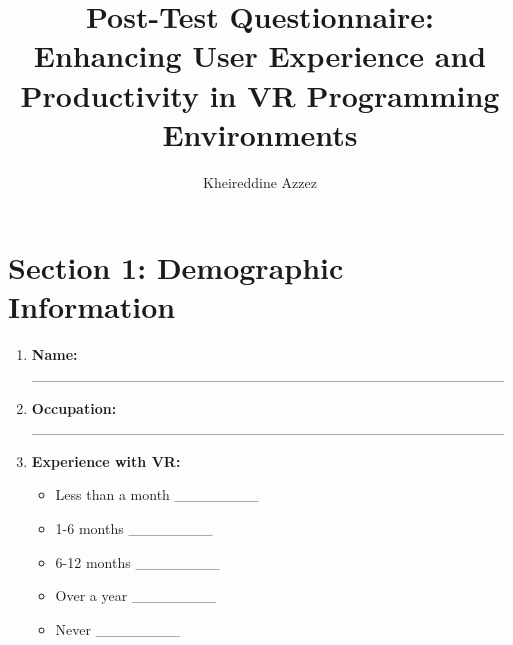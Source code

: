 \documentclass[12pt]{article}
\title{Post-Test Questionnaire: Enhancing User Experience and Productivity in VR Programming Environments}
\author{Kheireddine Azzez}
\date{}
\begin{document}
\maketitle

\section*{Section 1: Demographic Information}
\begin{enumerate}
    \item \textbf{Name:} \_\_\_\_\_\_\_\_\_\_\_\_\_\_\_\_\_\_\_\_\_\_\_\_\_\_\_\_\_\_\_\_\_\_\_\_\_\_\_\_\_\_\_\_\_\  
    \item \textbf{Occupation:} \_\_\_\_\_\_\_\_\_\_\_\_\_\_\_\_\_\_\_\_\_\_\_\_\_\_\_\_\_\_\_\_\_\_\_\_\_\_\_\_\_\_\_\_\_\  
    \item \textbf{Experience with VR:}
    \begin{itemize}
        \item Less than a month \_\_\_\_\_\_\_\_\    
        \item 1-6 months \_\_\_\_\_\_\_\_\    
        \item 6-12 months \_\_\_\_\_\_\_\_\    
        \item Over a year \_\_\_\_\_\_\_\_\   
        \item Never \_\_\_\_\_\_\_\_\   
    \end{itemize}
\end{enumerate}
\end{document}
